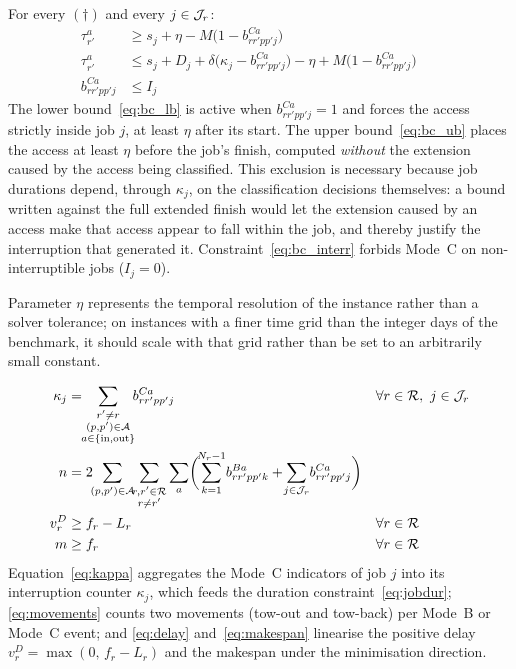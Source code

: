 For every $(\dagger)$ and every $j \in \mathcal{J}_r$:
\begin{align}
  \tau^a_{r'} &\ge s_j + \eta - M\bigl(1 - b^{Ca}_{rr'pp'j}\bigr)
    && \label{eq:bc_lb}\\
  \tau^a_{r'} &\le s_j + D_j + \delta\bigl(\kappa_j - b^{Ca}_{rr'pp'j}\bigr)
                - \eta + M\bigl(1 - b^{Ca}_{rr'pp'j}\bigr)
    && \label{eq:bc_ub}\\
  b^{Ca}_{rr'pp'j} &\le I_j
    && \label{eq:bc_interr}
\end{align}
The lower bound~\eqref{eq:bc_lb} is active when
$b^{Ca}_{rr'pp'j} = 1$ and forces the access strictly inside job $j$,
at least $\eta$ after its start.  The upper bound~\eqref{eq:bc_ub}
places the access at least $\eta$ before the job's finish, computed
\emph{without} the extension caused by the access being classified.
This exclusion is necessary because job durations depend, through
$\kappa_j$, on the classification decisions themselves: a bound written
against the full extended finish would let the extension caused by an
access make that access appear to fall within the job, and thereby
justify the interruption that generated it.
Constraint~\eqref{eq:bc_interr} forbids Mode~C on non-interruptible
jobs ($I_j = 0$).

Parameter $\eta$ represents the temporal resolution of the instance
rather than a solver tolerance; on instances with a finer time grid than
the integer days of the benchmark, it should scale with that grid rather
than be set to an arbitrarily small constant.

\begin{align}
  \kappa_j &=
    \!\!\sum_{\substack{r' \ne r\\ (p,p') \in \calA\\ a \in \{\mathrm{in}, \mathrm{out}\}}}
    \!\! b^{Ca}_{rr'pp'j}
    && \forall r \in \calR,\ j \in \calJ_r \label{eq:kappa}\\
  n &= 2 \!\!\sum_{(p,p') \in \calA}
       \!\!\sum_{\substack{r,r' \in \calR \\ r \ne r'}}
       \sum_{a}
       \biggl(
         \!\sum_{k=1}^{N_r-1}\! b^{Ba}_{rr'pp'k}
         + \!\sum_{j \in \calJ_r}\! b^{Ca}_{rr'pp'j}
       \biggr)
    && \label{eq:movements}\\
  v^D_r &\ge f_r - L_r
    && \forall r \in \calR \label{eq:delay}\\
  m &\ge f_r
    && \forall r \in \calR \label{eq:makespan}
\end{align}
Equation~\eqref{eq:kappa} aggregates the Mode~C indicators of job $j$
into its interruption counter $\kappa_j$, which feeds the duration
constraint~\eqref{eq:jobdur}; \eqref{eq:movements} counts two movements
(tow-out and tow-back) per Mode~B or Mode~C event; and
\eqref{eq:delay} and~\eqref{eq:makespan} linearise the positive delay
$v^D_r = \max(0,\, f_r - L_r)$ and the makespan under the minimisation
direction.

